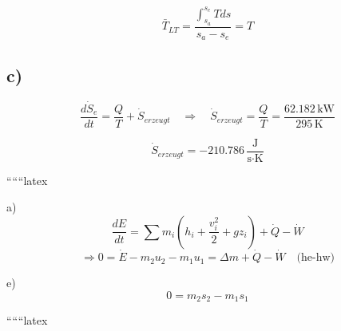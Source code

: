 \begin{equation*}
\bar{T}_{LT} = \frac{\int_{s_a}^{s_e} T ds}{s_a - s_e} = T
\end{equation*}

\subsection*{c)}

\begin{equation*}
\frac{d\dot{S}_e}{dt} = \frac{Q}{T} + \dot{S}_{erzeugt} \quad \Rightarrow \quad \dot{S}_{erzeugt} = \frac{Q}{T} = \frac{62.182 \, \text{kW}}{295 \, \text{K}}
\end{equation*}

\begin{equation*}
\dot{S}_{erzeugt} = -210.786 \, \frac{\text{J}}{\text{s} \cdot \text{K}}
\end{equation*}

``````latex


a)
\[
\frac{dE}{dt} = \sum m_i \left( h_i + \frac{v_i^2}{2} + gz_i \right) + \dot{Q} - \dot{W}
\]
\[
\Rightarrow 0 = \dot{E} - m_2 u_2 - m_1 u_1 = \Delta m + \dot{Q} - \dot{W} \quad \text{(he-hw)}
\]

e)
\[
0 = m_2 s_2 - m_1 s_1
\]

``````latex


